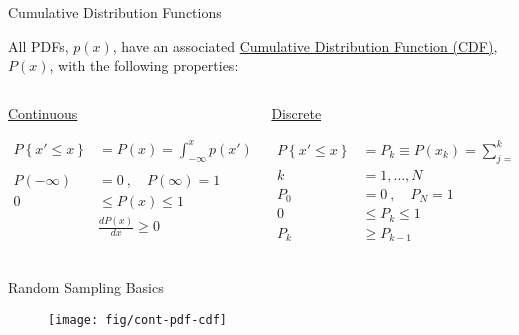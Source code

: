 \documentclass[xcolor=x11names,compress]{beamer}
\renewcommand{\(}{\begin{columns}}
\renewcommand{\)}{\end{columns}}
\newcommand{\<}[1]{\begin{column}{#1}}
\renewcommand{\>}{\end{column}}
\begin{document}
\begin{frame}{Cumulative Distribution Functions}

All PDFs, $p(x)$, have an associated \underline{Cumulative Distribution Function (CDF)}, $P(x)$, with the following properties:

\begin{columns}
  \begin{column}{0.5\textwidth}
    \begin{center}
    \textcolor{berkeleygold}{\underline{Continuous}} 
    \end{center}
    \begin{align*}
    P\left\lbrace x' \leq x \right\rbrace &= P(x) = \int_{-\infty}^x p(x')dx'\\
    & \\
    P(-\infty) &= 0 \:,\quad P(\infty) = 1 \\
    0 &\leq P(x) \leq 1 \\
    &\frac{dP(x)}{dx} \geq 0
    \end{align*}
  \end{column}
  \begin{column}{0.5\textwidth}
    \begin{center}
    \textcolor{berkeleyblue}{\underline{Discrete}}  
    \end{center}
    \begin{align*}
    P\left\lbrace x' \leq x \right\rbrace &= P_k \equiv P(x_k) = \sum_{j=1}^k p_j\\
    k &= 1, \dots, N \\
    P_0 &= 0 \:,\quad P_N = 1 \\
    0 &\leq P_k \leq 1 \\
    P_k & \geq P_{k-1} \\
    \end{align*}
  \end{column}
\end{columns}

\end{frame}


\begin{frame}{Random Sampling Basics}

  	\begin{figure}
  	\begin{center}
  		\texttt{[image: fig/cont-pdf-cdf]}
	\end{center}
  	\end{figure}

\end{frame}
\end{document}
